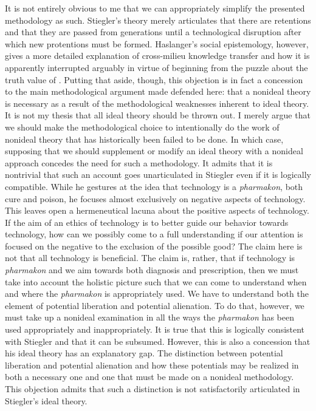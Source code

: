 \documentclass[letterpaper,notitlepage,12pt]{article}
\begin{document}
It is not entirely obvious to me that we can appropriately simplify the
presented methodology as such.
Stiegler's theory merely articulates that there are retentions and that they are
passed from generations until a technological disruption after which new
protentions must be formed.
Haslanger's social epistemology, however, gives a more detailed explanation of
cross-milieu knowledge transfer and how it is apparently interrupted arguably in
virtue of beginning from the puzzle about the truth value of .
Putting that aside, though, this objection is in fact a concession to the main
methodological argument made defended here: that a nonideal theory is necessary
as a result of the methodological weaknesses inherent to ideal theory.
It is not my thesis that all ideal theory should be thrown out.
I merely argue that we should make the methodological choice to intentionally do
the work of nonideal theory that has historically been failed to be done.
In which case, supposing that we should supplement or modify an ideal theory with
a nonideal approach concedes the need for such a methodology.
It admits that it is nontrivial that such an account goes unarticulated in
Stiegler even if it is logically compatible.
While he gestures at the idea that technology is a \textit{pharmakon}, both cure
and poison, he focuses almost exclusively on negative aspects of technology.
This leaves open a hermeneutical lacuna about the positive aspects of
technology.
If the aim of an ethics of technology is to better guide our behavior towards
technology, how can we possibly come to a full understanding if our attention is
focused on the negative to the exclusion of the possible good?
The claim here is not that all technology is beneficial.
The claim is, rather, that if technology is \textit{pharmakon} and we aim
towards both diagnosis and prescription, then we must take into account the
holistic picture such that we can come to understand when and where the
\textit{pharmakon} is appropriately used.
We have to understand both the element of potential liberation and potential
alienation.
To do that, however, we must take up a nonideal examination in all the ways the
\textit{pharmakon} has been used appropriately and inappropriately.
It is true that this is logically consistent with Stiegler and that it can be
subsumed.
However, this is also a concession that his ideal theory has an explanatory gap.
The distinction between potential liberation and potential alienation and how
these potentials may be realized in both a necessary one and one that must be
made on a nonideal methodology.
This objection admits that such a distinction is not satisfactorily articulated
in Stiegler's ideal theory.
\end{document}
